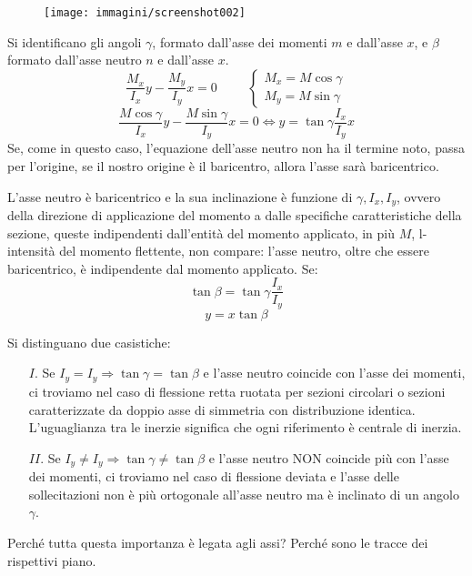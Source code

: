 \documentclass{article}
\begin{document}
\begin{adjustwidth}{2in}{}
\begin{figure}[H]
	\centering
	\label{fig:screenshot002}
	\texttt{[image: immagini/screenshot002]}
\end{figure}
		
		Si identificano gli angoli $\gamma$, formato dall'asse dei momenti $m$ e dall'asse $x$, e $\beta$ formato dall'asse neutro $n$ e dall'asse $x$.
		\[\dfrac{M_x}{I_x}y - \dfrac{M_y}{I_y}x = 0 \hspace{1cm} \begin{cases}
			M_x = M\cos\gamma \\
			M_y = M\sin\gamma
		\end{cases}\]
		\[\dfrac{ M\cos\gamma}{I_x}y - \dfrac{M\sin\gamma}{I_y}x =0 \Leftrightarrow y = \tan\gamma \dfrac{I_x}{I_y}x\]
		Se, come in questo caso, l'equazione dell'asse neutro non ha il termine noto, passa per l'origine, se il nostro origine è il baricentro, allora l'asse sarà baricentrico.\newline 
		
		L'asse neutro è baricentrico e la sua inclinazione è funzione di $\gamma, I_x, I_y$, ovvero della direzione di applicazione del momento a dalle specifiche caratteristiche della sezione, queste indipendenti dall'entità del momento applicato, in più $M$, l-intensità del momento flettente, non compare: l'asse neutro, oltre che essere baricentrico, è indipendente dal momento applicato. \newline
		Se:
		\[ \tan\beta = \tan\gamma \dfrac{I_x}{I_y} \]
		\[ y = x\tan\beta \]
		
		Si distinguano due casistiche:
		\begin{itemize}
			\item[$ I. $] Se $I_y = I_y \Rightarrow \tan\gamma = \tan\beta $ e l'asse neutro coincide con l'asse dei momenti, ci troviamo nel caso di flessione retta ruotata per sezioni circolari o sezioni caratterizzate da doppio asse di simmetria con distribuzione identica. L’uguaglianza tra
			le inerzie significa che ogni
			riferimento è centrale di inerzia.
			
			\item[$ II. $] Se $I_y \neq I_y \Rightarrow \tan\gamma \neq \tan\beta $ e l'asse neutro NON coincide più con l'asse dei momenti, ci troviamo nel caso di flessione deviata e l'asse delle sollecitazioni non è più ortogonale all'asse neutro ma è inclinato di un angolo $\gamma$.
		\end{itemize}
		 
		
		Perché tutta questa importanza è legata agli assi? Perché sono le tracce dei rispettivi piano. \newline 
		

\end{adjustwidth}
\end{document}

